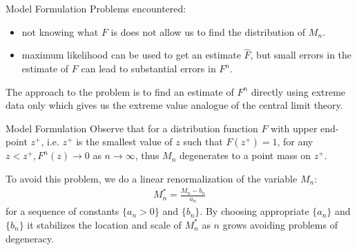 \documentclass[10pt]{beamer}
\begin{document}
\begin{frame}{Model Formulation}
Problems encountered:
\begin{itemize}
\item not knowing what $F$ is does not allow us to find the distribution of $M_n$.
\item maximum likelihood can be used to get an estimate $\widehat{F}$, but small errors in the estimate of $F$ can lead to substantial errors in $F^n$.
\end{itemize}
The approach to the problem is to find an estimate of $F^n$ directly using extreme data only which gives us the extreme value analogue of the central limit theory.
\end{frame}

\begin{frame}{Model Formulation}
Observe that for a distribution function $F$ with upper end-point $z^+$, i.e. $z^+$ is the smallest value of $z$ such that $F(z^+) = 1$, for any $z<z^+, F^n(z) \to 0$ as $n \to \infty$, thus $M_n$ degenerates to a point mass on $z^+$. 

To avoid this problem, we do a linear renormalization of the variable $M_n$:
\begin{align*}
M_n^\ast = \frac{M_n - b_n}{a_n}
\end{align*}
for a sequence of constants $\{a_n>0\}$ and $\{b_n\}$. By choosing appropriate $\{a_n\}$ and $\{b_n\}$ it stabilizes the location and scale of $M_n^\ast$ as $n$ grows avoiding problems of degeneracy. %

\end{frame}
\end{document}
